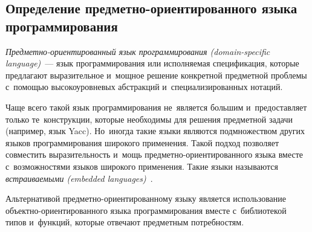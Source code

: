 \subsection{Определение предметно-ориентированного языка программирования} \label{sub121}

\textit{Предметно-ориентированный язык программирования (domain-specific language)}~--- язык программирования или исполняемая спецификация, которые предлагают выразительное и~мощное решение конкретной предметной проблемы с~помощью высокоуровневых абстракций и~специализированных нотаций. 

Чаще всего такой язык программирования не~является большим и~предоставляет только те~конструкции, которые необходимы для решения предметной задачи (например, язык Yacc). Но~иногда такие языки являются подмножеством других языков программирования широкого применения. Такой подход позволяет совместить выразительность и~мощь предметно-ориентированного языка вместе с~возможностями языков широкого применения. Такие языки называются \textit{встраиваемыми (embedded languages)}~\cite{VanDeursen2000}.

Альтернативой предметно-ориентированному языку является использование объектно-ориентированного языка программирования вместе с~библиотекой типов и~функций, которые отвечают предметным потребностям.~\cite{Deursen1998}